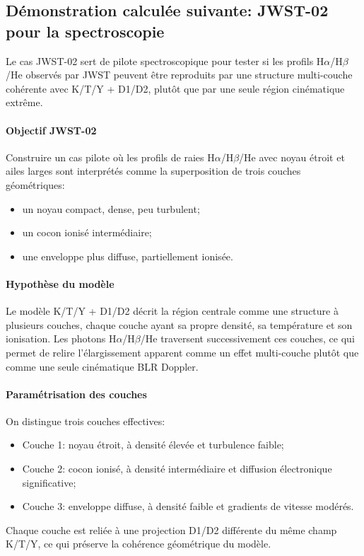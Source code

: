 \documentclass[11pt,a4paper]{article}
\begin{document}
\subsection{Démonstration calculée suivante: JWST-02 pour la spectroscopie}
Le cas JWST-02 sert de pilote spectroscopique pour tester si les profils H$\alpha$/H$\beta$/He observés par JWST peuvent être reproduits par une structure multi-couche cohérente avec K/T/Y + D1/D2, plutôt que par une seule région cinématique extrême.

\paragraph{Objectif JWST-02}
Construire un cas pilote où les profils de raies H$\alpha$/H$\beta$/He avec noyau étroit et ailes larges sont interprétés comme la superposition de trois couches géométriques:
\begin{itemize}
	\item un noyau compact, dense, peu turbulent;
	\item un cocon ionisé intermédiaire;
	\item une enveloppe plus diffuse, partiellement ionisée.
\end{itemize}

\paragraph{Hypothèse du modèle}
Le modèle K/T/Y + D1/D2 décrit la région centrale comme une structure à plusieurs couches, chaque couche ayant sa propre densité, sa température et son ionisation. Les photons H$\alpha$/H$\beta$/He traversent successivement ces couches, ce qui permet de relire l'élargissement apparent comme un effet multi-couche plutôt que comme une seule cinématique BLR Doppler.

\paragraph{Paramétrisation des couches}
On distingue trois couches effectives:
\begin{itemize}
	\item Couche 1: noyau étroit, à densité élevée et turbulence faible;
	\item Couche 2: cocon ionisé, à densité intermédiaire et diffusion électronique significative;
	\item Couche 3: enveloppe diffuse, à densité faible et gradients de vitesse modérés.
\end{itemize}
Chaque couche est reliée à une projection D1/D2 différente du même champ K/T/Y, ce qui préserve la cohérence géométrique du modèle.
\end{document}
